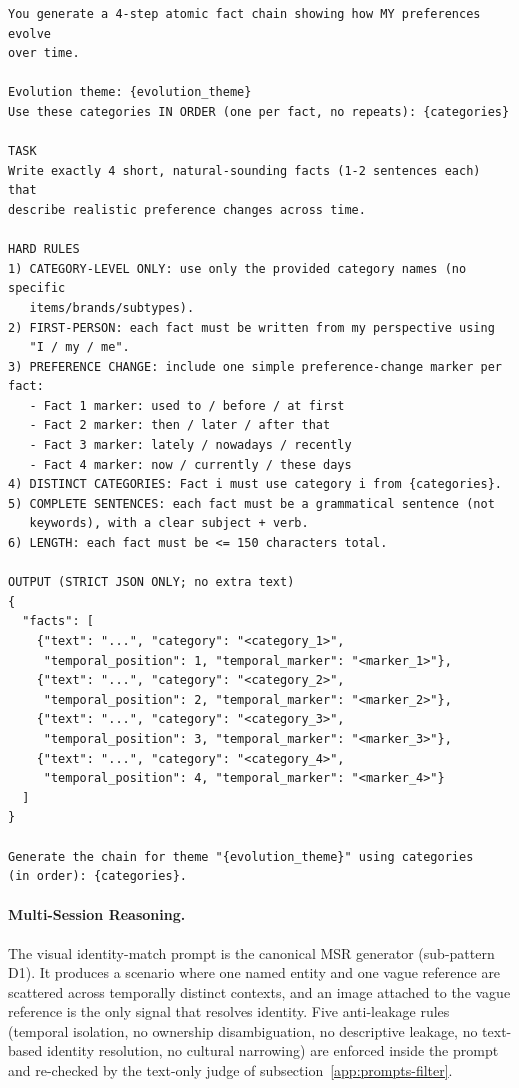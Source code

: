 \documentclass{llmxive}
\begin{document}
\begin{promptbox}[colback=black!5, colframe=white!40!black, title=Question Generation: KU (Atomic Evolution Chain)]{}
\scriptsize
\begin{verbatim}
You generate a 4-step atomic fact chain showing how MY preferences evolve
over time.

Evolution theme: {evolution_theme}
Use these categories IN ORDER (one per fact, no repeats): {categories}

TASK
Write exactly 4 short, natural-sounding facts (1-2 sentences each) that
describe realistic preference changes across time.

HARD RULES
1) CATEGORY-LEVEL ONLY: use only the provided category names (no specific
   items/brands/subtypes).
2) FIRST-PERSON: each fact must be written from my perspective using
   "I / my / me".
3) PREFERENCE CHANGE: include one simple preference-change marker per fact:
   - Fact 1 marker: used to / before / at first
   - Fact 2 marker: then / later / after that
   - Fact 3 marker: lately / nowadays / recently
   - Fact 4 marker: now / currently / these days
4) DISTINCT CATEGORIES: Fact i must use category i from {categories}.
5) COMPLETE SENTENCES: each fact must be a grammatical sentence (not
   keywords), with a clear subject + verb.
6) LENGTH: each fact must be <= 150 characters total.

OUTPUT (STRICT JSON ONLY; no extra text)
{
  "facts": [
    {"text": "...", "category": "<category_1>",
     "temporal_position": 1, "temporal_marker": "<marker_1>"},
    {"text": "...", "category": "<category_2>",
     "temporal_position": 2, "temporal_marker": "<marker_2>"},
    {"text": "...", "category": "<category_3>",
     "temporal_position": 3, "temporal_marker": "<marker_3>"},
    {"text": "...", "category": "<category_4>",
     "temporal_position": 4, "temporal_marker": "<marker_4>"}
  ]
}

Generate the chain for theme "{evolution_theme}" using categories
(in order): {categories}.
\end{verbatim}
\end{promptbox}

\paragraph{Multi-Session Reasoning.}
The visual identity-match prompt is the canonical MSR generator (sub-pattern D1). It produces a scenario where one named entity and one vague reference are scattered across temporally distinct contexts, and an image attached to the vague reference is the only signal that resolves identity. Five anti-leakage rules (temporal isolation, no ownership disambiguation, no descriptive leakage, no text-based identity resolution, no cultural narrowing) are enforced inside the prompt and re-checked by the text-only judge of subsection~\ref{app:prompts-filter}.
\end{document}
